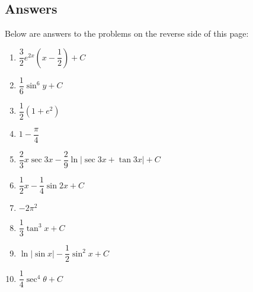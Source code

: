 \documentclass[12pt,letterpaper,fleqn]{article}
\theoremstyle{definition}
\begin{document}
\subsection*{Answers}
Below are answers to the problems on the reverse side of this page:
\begin{enumerate}
  \item $\dfrac{3}{2} e^{2x}\left(x - \dfrac{1}{2}\right) + C$
  \item $\dfrac{1}{6}\sin^6 y + C$
  \item $\dfrac{1}{2}(1 + e^2)$
  \item $1 - \dfrac{\pi}{4}$
  \item $\dfrac{2}{3} x\sec 3x - \dfrac{2}{9}\ln\left|\sec 3x + \tan 3x\right| + C$
  \item $\dfrac{1}{2}x - \dfrac{1}{4}\sin 2x + C$
  \item $-2\pi^2$
  \item $\dfrac{1}{3}\tan^3 x + C$
  \item $\ln\left|\sin x\right| - \dfrac{1}{2}\sin^2 x + C$
  \item $\dfrac{1}{4}\sec^4\theta + C$
\end{enumerate}
\end{document}

